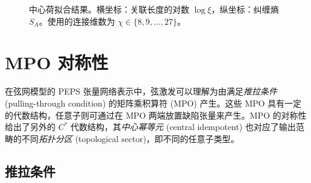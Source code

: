\begin{figure}[htb]
  \centering
   \quad
  \caption[中心荷拟合结果]{中心荷拟合结果。横坐标：关联长度的对数 $\log\xi$，纵坐标：纠缠熵 $S_A$。使用的连接维数为 $\chi\in\{8,9,\dots,27\}$。}
  \label{fig:central-charge}
\end{figure}

\section{MPO 对称性}

在弦网模型的 PEPS 张量网络表示中，弦激发可以理解为由满足\emph{推拉条件} (pulling-through condition) 的矩阵乘积算符 (MPO) 产生。这些 MPO 具有一定的代数结构，任意子则可通过在 MPO 两端放置缺陷张量来产生。MPO 的对称性给出了另外的 $C^*$ 代数结构，其\emph{中心幂等元} (central idempotent) 也对应了输出范畴的不同\emph{拓扑分区} (topological sector)，即不同的任意子类型\cite{bultinck2017anyons,williamson2017symmetry,lootens2019cardy,aasen2020topological,sahinoglu2021characterizing}。

\subsection{推拉条件}

